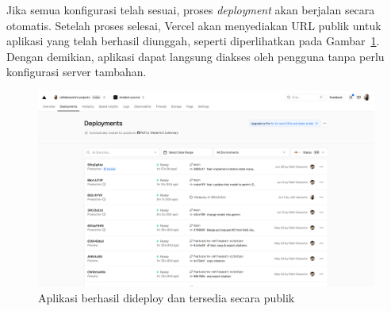 Jika semua konfigurasi telah sesuai, proses \textit{deployment} akan berjalan secara otomatis. Setelah proses selesai, Vercel akan menyediakan URL publik untuk aplikasi yang telah berhasil diunggah, seperti diperlihatkan pada Gambar~\ref{fig:finish-deploy}. Dengan demikian, aplikasi dapat langsung diakses oleh pengguna tanpa perlu konfigurasi server tambahan.

\begin{figure}[H]
  \centering
  \includegraphics[width=0.85\linewidth]{images/bab-3/deploy-4.png}
  \caption{Aplikasi berhasil dideploy dan tersedia secara publik}\label{fig:finish-deploy}
\end{figure}